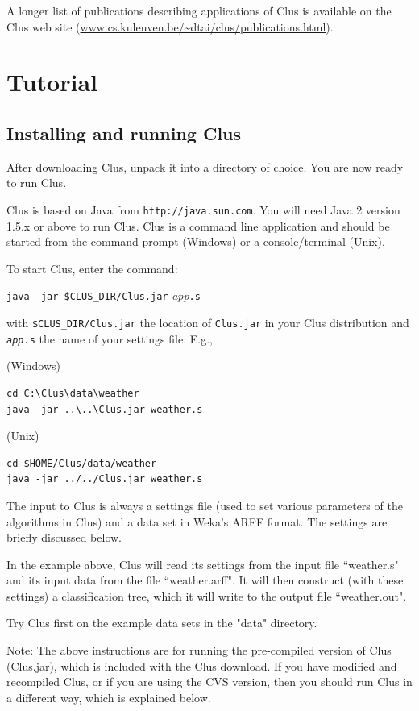 \documentclass[a4paper]{report}
\begin{document}
A longer list of publications describing applications of Clus is available on the Clus web site
(\url{www.cs.kuleuven.be/~dtai/clus/publications.html}).

\chapter{Tutorial}

\section{Installing and running Clus}

After downloading Clus, unpack it into a directory of choice.
You are now ready to run Clus.

Clus is based on Java from {\tt http://java.sun.com}. You will need 
Java 2 version 1.5.x or above to run Clus. Clus is a command line 
application and should be started from the command prompt
(Windows) or a console/terminal (Unix).

To start Clus, enter the command:
\begin{flushleft}
\verb^java -jar $CLUS_DIR/Clus.jar^ {\em app}\verb^.s^
\end{flushleft}

with \verb^$CLUS_DIR/Clus.jar^ the location of \verb^Clus.jar^ in your Clus 
distribution and {\tt {\em app}.s} the name of your settings file. E.g.,

(Windows)
\begin{verbatim}
cd C:\Clus\data\weather
java -jar ..\..\Clus.jar weather.s
\end{verbatim}

(Unix)
\begin{verbatim}
cd $HOME/Clus/data/weather
java -jar ../../Clus.jar weather.s
\end{verbatim}

The input to Clus is always a settings file (used to set various 
parameters of the algorithms in Clus) and a data set in Weka's 
ARFF format. The settings are briefly discussed below.

In the example above, Clus will read its settings from the input file 
``weather.s" and its input data from the file ``weather.arff". It will then construct 
(with these settings) a classification tree, which it will write to the 
output file ``weather.out".

Try Clus first on the example data sets in the "data" directory.

Note: The above instructions are for running the pre-compiled version 
of Clus (Clus.jar), which is included with the Clus download. If you have 
modified and recompiled Clus, or if you are using the CVS version, then
you should run Clus in a different way, which is explained below.
\end{document}
